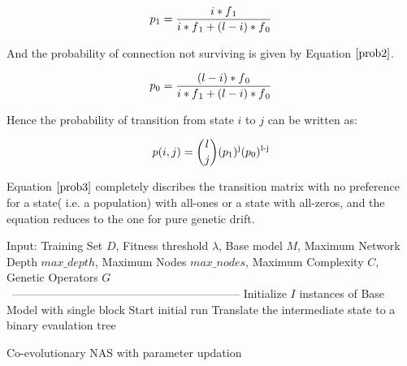 \documentclass[conference]{IEEEtran}
\begin{document}
\begin{equation}
p\textsubscript{1} = \frac{i*f\textsubscript{1}}{i*f\textsubscript{1} + (l-i)*f\textsubscript{0}}
\label{prob1}
\end{equation}

And the probability of connection not surviving is given by Equation $\ref{prob2}$.

\begin{equation}
p\textsubscript{0} = \frac{(l-i)*f\textsubscript{0}}{i*f\textsubscript{1} + (l-i)*f\textsubscript{0}}
\label{prob2}
\end{equation}

Hence the probability of transition from state $i$ to $j$ can be written as:

\begin{equation}
p(i,j) = {l \choose j}(p\textsubscript{1})\textsuperscript{j}(p\textsubscript{0})\textsuperscript{l-j}\\
\label{prob3}
\end{equation}

Equation $\ref{prob3}$ completely discribes the transition matrix with no preference for a state( i.e. a population) with all-ones or a state with all-zeros, and the equation reduces to the one for pure genetic drift.
\begin{algorithm}
\SetAlgoLined
Input: Training Set $D$, Fitness threshold $\lambda$, Base model $M$, Maximum Network Depth $max\_depth$, Maximum Nodes $max\_nodes$, Maximum Complexity $C$, Genetic Operators $G$\\
\
------------------------------------------------------------
Initialize $I$ instances of Base Model with single block\;
Start initial run\;
Translate the intermediate state to a binary evaulation tree\;
\caption{Co-evolutionary NAS with parameter updation}
\label{alg1}
\end{algorithm}
\end{document}
